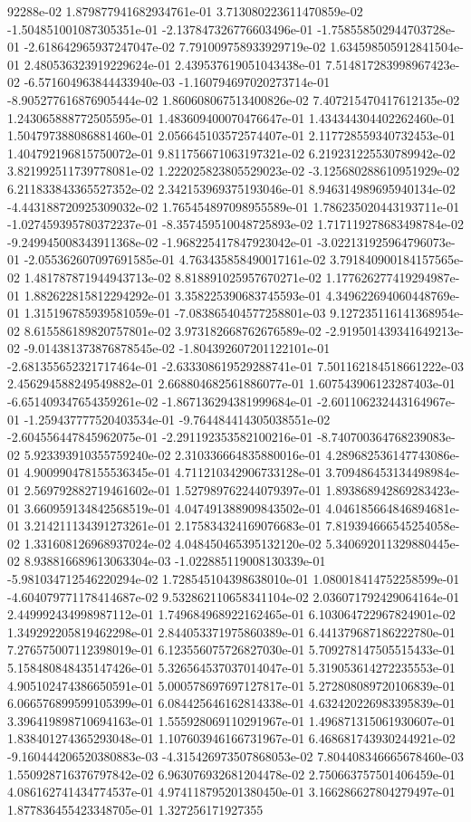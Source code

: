 92288e-02	1.879877941682934761e-01	3.713080223611470859e-02	-1.504851001087305351e-01	-2.137847326776603496e-01	-1.758558502944703728e-01	-2.618642965937247047e-02	7.791009758933929719e-02	1.634598505912841504e-01	2.480536323919229624e-01	2.439537619051043438e-01	7.514817283998967423e-02	-6.571604963844433940e-03	-1.160794697020273714e-01	-8.905277616876905444e-02	1.860608067513400826e-02	7.407215470417612135e-02	1.243065888772505595e-01	1.483609400070476647e-01	1.434344304402262460e-01	1.504797388086881460e-01	2.056645103572574407e-01	2.117728559340732453e-01	1.404792196815750072e-01	9.811756671063197321e-02	6.219231225530789942e-02	3.821992511739778081e-02	1.222025823805529023e-02	-3.125680288610951929e-02	6.211833843365527352e-02	2.342153969375193046e-01	8.946314989695940134e-02	-4.443188720925309032e-02	1.765454897098955589e-01	1.786235020443193711e-01	-1.027459395780372237e-01	-8.357459510048725893e-02	1.717119278683498784e-02	-9.249945008343911368e-02	-1.968225417847923042e-01	-3.022131925964796073e-01	-2.055362607097691585e-01	4.763435858490017161e-02	3.791840900184157565e-02	1.481787871944943713e-02	8.818891025957670271e-02	1.177626277419294987e-01	1.882622815812294292e-01	3.358225390683745593e-01	4.349622694060448769e-01	1.315196785939581059e-01	-7.083865404577258801e-03	9.127235116141368954e-02	8.615586189820757801e-02	3.973182668762676589e-02	-2.919501439341649213e-02	-9.014381373876878545e-02	-1.804392607201122101e-01	-2.681355652321717464e-01	-2.633308619529288741e-01	7.501162184518661222e-03	2.456294588249549882e-01	2.668804682561886077e-01	1.607543906123287403e-01	-6.651409347654359261e-02	-1.867136294381999684e-01	-2.601106232443164967e-01	-1.259437777520403534e-01	-9.764484414305038551e-02	-2.604556447845962075e-01	-2.291192353582100216e-01	-8.740700364768239083e-02	5.923393910355759240e-02	2.310336664835880016e-01	4.289682536147743086e-01	4.900990478155536345e-01	4.711210342906733128e-01	3.709486453134498984e-01	2.569792882719461602e-01	1.527989762244079397e-01	1.893868942869283423e-01	3.660959134842568519e-01	4.047491388909843502e-01	4.046185664846894681e-01	3.214211134391273261e-01	2.175834324169076683e-01	7.819394666545254058e-02	1.331608126968937024e-02	4.048450465395132120e-02	5.340692011329880445e-02	8.938816689613063304e-03	-1.022885119008130339e-01	-5.981034712546220294e-02	1.728545104398638010e-01	1.080018414752258599e-01	-4.604079771178414687e-02	9.532862110658341104e-02	2.036071792429064164e-01	2.449992434998987112e-01	1.749684968922162465e-01	6.103064722967824901e-02	1.349292205819462298e-01	2.844053371975860389e-01	6.441379687186222780e-01	7.276575007112398019e-01	6.123556075726827030e-01	5.709278147505515433e-01	5.158480848435147426e-01	5.326564537037014047e-01	5.319053614272235553e-01	4.905102474386650591e-01	5.000578697697127817e-01	5.272808089720106839e-01	6.066576899599105399e-01	6.084425646162814338e-01	4.632420226983395839e-01	3.396419898710694163e-01	1.555928069110291967e-01	1.496871315061930607e-01	1.838401274365293048e-01	1.107603946166731967e-01	6.468681743930244921e-02	-9.160444206520380883e-03	-4.315426973507868053e-02	7.804408346665678460e-03	1.550928716376797842e-02	6.963076932681204478e-02	2.750663757501406459e-01	4.086162741434774537e-01	4.974118795201380450e-01	3.166286627804279497e-01	1.877836455423348705e-01	1.327256171927355